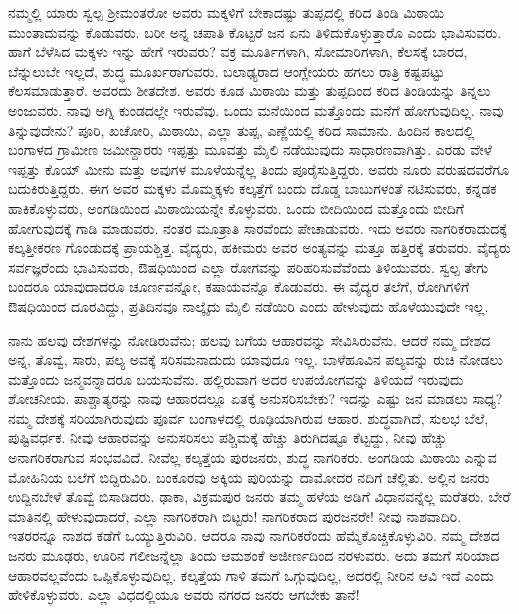 ನಮ್ಮಲ್ಲಿ ಯಾರು ಸ್ವಲ್ಪ ಶ‍್ರೀಮಂತರೋ ಅವರು ಮಕ್ಕಳಿಗೆ ಬೇಕಾದಷ್ಟು ತುಪ್ಪದಲ್ಲಿ ಕರಿದ ತಿಂಡಿ ಮಿಠಾಯಿ ಮುಂತಾದುವನ್ನು ಕೊಡುವರು. ಬರೀ ಅನ್ನ ಚಪಾತಿ ಕೊಟ್ಟರೆ ಜನ ಏನು ತಿಳಿದುಕೊಳ್ಳುತ್ತಾರೊ ಎಂದು ಭಾವಿಸುವರು. ಹಾಗೆ ಬೆಳೆಸಿದ ಮಕ್ಕಳು ಇನ್ನು ಹೇಗೆ ಇರುವರು? ವಕ್ರ ಮೂರ್ತಿಗಳಾಗಿ, ಸೋಮಾರಿಗಳಾಗಿ, ಕೆಲಸಕ್ಕೆ ಬಾರದ, ಬೆನ್ನುಲುಬೇ ಇಲ್ಲದೆ, ಶುದ್ಧ ಮೂರ್ಖರಾಗುವರು. ಬಲಾಢ್ಯರಾದ ಆಂಗ್ಲೇಯರು ಹಗಲು ರಾತ್ರಿ ಕಷ್ಟಪಟ್ಟು ಕೆಲಸಮಾಡುತ್ತಾರೆ. ಅವರದು ಶೀತದೇಶ. ಅವರು ಕೂಡ ಮಿಠಾಯಿ ಮತ್ತು ತುಪ್ಪದಿಂದ ಕರಿದ ತಿಂಡಿಯನ್ನು ತಿನ್ನಲು ಅಂಜುವರು. ನಾವು ಅಗ್ನಿ ಕುಂಡದಲ್ಲೇ ಇರುವೆವು. ಒಂದು ಮನೆಯಿಂದ ಮತ್ತೊಂದು ಮನೆಗೆ ಹೋಗುವುದಿಲ್ಲ. ನಾವು ತಿನ್ನುವುದೇನು? ಪೂರಿ, ಖಚೋರಿ, ಮಿಠಾಯಿ, ಎಲ್ಲಾ ತುಪ್ಪ, ಎಣ್ಣೆಯಲ್ಲಿ ಕರಿದ ಸಾಮಾನು. ಹಿಂದಿನ ಕಾಲದಲ್ಲಿ ಬಂಗಾಳದ ಗ್ರಾಮೀಣ ಜಮೀನ್ದಾರರು ಇಪ್ಪತ್ತು ಮೂವತ್ತು ಮೈಲಿ ನಡೆಯುವುದು ಸಾಧಾರಣವಾಗಿತ್ತು. ಎರಡು ವೇಳೆ ಇಪ್ಪತ್ತು ಕೊಯ್​ ಮೀನು ಮತ್ತು ಅವುಗಳ ಮೂಳೆ\break ಯನ್ನೆಲ್ಲ ತಿಂದು ಪೂರೈಸುತ್ತಿದ್ದರು. ಅವರು ನೂರು ವರುಷದವರೆಗೂ ಬದುಕಿರುತ್ತಿದ್ದರು. ಈಗ ಅವರ ಮಕ್ಕಳು ಮೊಮ್ಮಕ್ಕಳು ಕಲ್ಕತ್ತೆಗೆ ಬಂದು ದೊಡ್ಡ ಬಾಬುಗಳಂತೆ ನಟಿಸುವರು, ಕನ್ನಡಕ ಹಾಕಿಕೊಳ್ಳುವರು, ಅಂಗಡಿಯಿಂದ ಮಿಠಾಯಿಯನ್ನೇ ಕೊಳ್ಳುವರು. ಒಂದು ಬೀದಿಯಿಂದ ಮತ್ತೊಂದು ಬೀದಿಗೆ ಹೋಗುವುದಕ್ಕೆ ಗಾಡಿ ಮಾಡುವರು. ನಂತರ ಮೂತ್ರಾತಿ ಸಾರವೆಂದು ಪೇಚಾಡುವರು. ಇದು ಅವರು ನಾಗರಿಕರಾದುದಕ್ಕೆ ಕಲ್ಕತ್ತೀಕರಣ ಗೊಂಡುದಕ್ಕೆ ಪ್ರಾಯಶ್ಚಿತ್ತ. ವೈದ್ಯರು, ಹಕೀಮರು ಅವರ ಅಂತ್ಯವನ್ನು ಮತ್ತೂ ಹತ್ತಿರಕ್ಕೆ ತರುವರು. ವೈದ್ಯರು ಸರ್ವಜ್ಞರೆಂದು ಭಾವಿಸುವರು, ಔಷಧಿಯಿಂದ ಎಲ್ಲಾ ರೋಗವನ್ನು ಪರಿಹರಿಸುವೆ\break ವೆಂದು ತಿಳಿಯುವರು. ಸ್ವಲ್ಪ ತೇಗು ಬಂದರೂ ಯಾವುದಾದರೂ ಚೂರ್ಣವನ್ನೋ, ಕಷಾಯವನ್ನೊ ಕೊಡುವರು. ಈ ವೈದ್ಯರ ತಲೆಗೆ, ರೋಗಿಗಳಿಗೆ ಔಷಧಿಯಿಂದ ದೂರವಿದ್ದು, ಪ್ರತಿದಿನವೂ ನಾಲ್ಕೈದು ಮೈಲಿ ನಡೆಯಿರಿ ಎಂದು ಹೇಳುವುದು ಹೊಳೆಯುವುದೇ ಇಲ್ಲ.

\newpage

ನಾನು ಹಲವು ದೇಶಗಳನ್ನು ನೋಡಿರುವೆನು; ಹಲವು ಬಗೆಯ ಆಹಾರವನ್ನು ಸೇವಿಸಿರುವೆನು. ಆದರೆ ನಮ್ಮ ದೇಶದ ಅನ್ನ, ತೊವ್ವೆ, ಸಾರು, ಪಲ್ಯ ಅವಕ್ಕೆ ಸರಿಸಮ\break ನಾದುದು ಯಾವುದೂ ಇಲ್ಲ. ಬಾಳೆಹೂವಿನ ಪಲ್ಯವನ್ನು ರುಚಿ ನೋಡಲು ಮತ್ತೊಂದು ಜನ್ಮವನ್ನಾದರೂ ಬಯಸುವೆನು. ಹಲ್ಲಿರುವಾಗ ಅದರ ಉಪಯೋಗವನ್ನು ತಿಳಿಯದೆ ಇರುವುದು ಶೋಚನೀಯ. ಪಾಶ್ಚಾತ್ಯರನ್ನು ನಾವು ಆಹಾರದಲ್ಲೂ ಏತಕ್ಕೆ ಅನುಸರಿಸಬೇಕು? ಇದನ್ನು ಎಷ್ಟು ಜನ ಮಾಡಲು ಸಾಧ್ಯ? ನಮ್ಮ ದೇಶಕ್ಕೆ ಸರಿಯಾಗಿರುವುದು ಪೂರ್ವ ಬಂಗಾಳದಲ್ಲಿ ರೂಢಿಯಾಗಿರುವ ಆಹಾರ. ಶುದ್ಧವಾಗಿದೆ, ಸುಲಭ ಬೆಲೆ, ಪುಷ್ಟಿವರ್ಧಕ. ನೀವು ಆಹಾರವನ್ನು ಅನುಸರಿಸಲು ಪಶ್ಚಿಮಕ್ಕೆ ಹೆಚ್ಚು ತಿರುಗಿದಷ್ಟೂ ಕೆಟ್ಟದ್ದು, ನೀವು ಹೆಚ್ಚು ಅನಾಗರಿಕರಾಗುವ ಸಂಭವವಿದೆ. ನೀವೆಲ್ಲ ಕಲ್ಕತ್ತೆಯ ಪುರಜನರು, ಶುದ್ಧ ನಾಗರಿಕರು. ಅಂಗಡಿಯ ಮಿಠಾಯಿ ಎನ್ನುವ ಮೋಹಿನಿಯ ಬಲೆಗೆ ಬಿದ್ದಿರುವಿರಿ. ಬಂಕೂರವು ಅಕ್ಕಿಯ ಪುರಿಯನ್ನು ದಾಮೋದರ ನದಿಗೆ ಚೆಲ್ಲಿತು. ಅಲ್ಲಿನ ಜನರು ಉದ್ದಿನಬೇಳೆ ತೊವ್ವೆ ಬಿಸಾಡಿದರು. ಢಾಕಾ, ವಿಕ್ರಮಪುರ ಜನರು ತಮ್ಮ ಹಳೆಯ ಅಡಿಗೆ ವಿಧಾನವನ್ನೆಲ್ಲ ಮರೆತರು. ಬೇರೆ ಮಾತಿನಲ್ಲಿ ಹೇಳುವುದಾದರೆ, ಎಲ್ಲಾ ನಾಗರಿಕರಾಗಿ ಬಿಟ್ಟರು! ನಾಗರಿಕರಾದ ಪುರಜನರೇ! ನೀವು ನಾಶವಾದಿರಿ. ಇತರರನ್ನೂ ನಾಶದ ಕಡೆಗೆ ಒಯ್ಯುತ್ತಿರುವಿರಿ. ಆದರೂ ನಾವು ನಾಗರಿಕರೆಂದು ಹೆಮ್ಮೆಕೊಚ್ಚಿಕೊಳ್ಳುವಿರಿ. ನಮ್ಮ ದೇಶದ ಜನರು ಮೂಢರು, ಊರಿನ ಗಲೀಜನ್ನೆಲ್ಲಾ ತಿಂದು ಆಮಶಂಕೆ ಅಜೀರ್ಣದಿಂದ ನರಳುವರು. ಅದು ತಮಗೆ ಸರಿಯಾದ ಆಹಾರವಲ್ಲವೆಂದು ಒಪ್ಪಿಕೊಳ್ಳುವುದಿಲ್ಲ. ಕಲ್ಕತ್ತೆಯ ಗಾಳಿ ತಮಗೆ ಒಗ್ಗುವುದಿಲ್ಲ, ಅದರಲ್ಲಿ ನೀರಿನ ಆವಿ ಇದೆ ಎಂದು ಹೇಳಿಕೊಳ್ಳುವರು. ಎಲ್ಲಾ ವಿಧದಲ್ಲಿಯೂ ಅವರು ನಗರದ ಜನರು ಆಗಬೇಕು ತಾನೆ!

